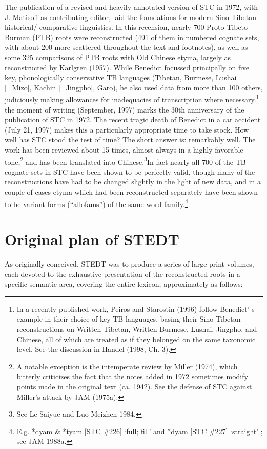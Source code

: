 The publication of a revised and heavily annotated version of STC in 1972, with J. Matisoff as contributing editor, laid the foundations for modern Sino-Tibetan historical/ comparative linguistics. In this recension, nearly 700 Proto-Tibeto-Burman (PTB) roots were reconstructed (491 of them in numbered cognate sets, with about 200 more scattered throughout the text and footnotes), as well as some 325 comparisons of PTB roots with Old Chinese etyma, largely as reconstructed by Karlgren (1957). While Benedict focussed principally on five key, phonologically conservative TB languages (Tibetan, Burmese, Lushai [=Mizo], Kachin [=Jingpho], Garo), he also used data from more than 100 others, judiciously making allowances for inadequacies of transcription where necessary.\footnote{In a recently published work, Peiros and Starostin (1996) follow Benedict' s example in their choice of key TB languages, basing their Sino-Tibetan reconstructions on Written Tibetan, Written Burmese, Lushai, Jingpho, and Chinese, all of which are treated as if they belonged on the same taxonomic level. See the discussion in Handel (1998, Ch. 3).} the moment of writing (September, 1997) marks the 30th anniversary of the publication of STC in 1972. The recent tragic death of Benedict in a car accident (July 21, 1997) makes this a particularly appropriate time to take stock. How well has STC stood the test of time? The short answer is: remarkably well. The work has been reviewed about 15 times, almost always in a highly favorable tone,\footnote{A notable exception is the intemperate review by Miller (1974), which bitterly criticizes the fact that the notes added in 1972 sometimes modify points made in the original text (ca. 1942). See the defense of STC against Miller's attack by JAM (1975a).} and has been translated into Chinese.\footnote{See Le Saiyue and Luo Meizhen 1984.}In fact nearly all 700 of the TB cognate sets in STC have been shown to be perfectly valid, though many of the reconstructions have had to be changed slightly in the light of new data, and in a couple of cases etyma which had been reconstructed separately have been shown to be variant forms (``allofams'') of the same word-family.\footnote{E.g. *dyam \& *tyam [STC $\#$226] `full; fill' and *dyam [STC $\#$227] `straight' ; see JAM 1988a.}

\section{Original plan of STEDT}
As originally conceived, STEDT was to produce a series of large
print volumes, each devoted to the exhaustive presentation of the reconstructed
roots in a specific semantic area, covering the entire lexicon, approximately as
follows:

